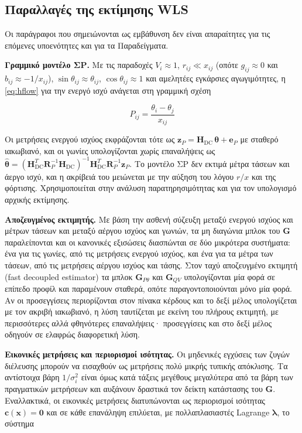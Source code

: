 \subsection{Παραλλαγές της εκτίμησης WLS}

Οι παράγραφοι που σημειώνονται ως εμβάθυνση δεν είναι απαραίτητες για τις επόμενες
υποενότητες και για τα Παραδείγματα.

\textbf{Γραμμικό μοντέλο ΣΡ.} Με τις παραδοχές $V_i \approx 1$, $r_{ij} \ll x_{ij}$ (οπότε
$g_{ij} \approx 0$ και $b_{ij} \approx -1/x_{ij}$), $\sin\theta_{ij} \approx \theta_{ij}$,
$\cos\theta_{ij} \approx 1$ και αμελητέες εγκάρσιες αγωγιμότητες, η \eqref{eq:hflow} για την
ενεργό ισχύ ανάγεται στη γραμμική σχέση

\begin{equation}
P_{ij} = \frac{\theta_i - \theta_j}{x_{ij}}
\label{eq:dcflow}
\end{equation}

Οι μετρήσεις ενεργού ισχύος εκφράζονται τότε ως $\mathbf{z}_P = \mathbf{H}_{\mathrm{DC}}\,
\boldsymbol{\theta} + \mathbf{e}_P$ με σταθερό ιακωβιανό, και οι γωνίες υπολογίζονται χωρίς
επαναλήψεις ως $\hat{\boldsymbol{\theta}} = (\mathbf{H}_{\mathrm{DC}}^{T}\mathbf{R}_P^{-1}
\mathbf{H}_{\mathrm{DC}})^{-1}\mathbf{H}_{\mathrm{DC}}^{T}\mathbf{R}_P^{-1}\mathbf{z}_P$. Το
μοντέλο ΣΡ δεν εκτιμά μέτρα τάσεων και άεργο ισχύ, και η ακρίβειά του μειώνεται με την αύξηση
του λόγου $r/x$ και της φόρτισης. Χρησιμοποιείται στην ανάλυση παρατηρησιμότητας και για
τον υπολογισμό αρχικής εκτίμησης.

\textbf{Αποζευγμένος εκτιμητής.} Με βάση την ασθενή σύζευξη μεταξύ ενεργού ισχύος και μέτρων
τάσεων και μεταξύ αέργου ισχύος και γωνιών, τα μη διαγώνια μπλοκ του $\mathbf{G}$ παραλείπονται
και οι κανονικές εξισώσεις διασπώνται σε δύο μικρότερα συστήματα: ένα για τις γωνίες, από
τις μετρήσεις ενεργού ισχύος, και ένα για τα μέτρα των τάσεων, από τις μετρήσεις αέργου
ισχύος και τάσης. Στον ταχύ αποζευγμένο εκτιμητή (fast decoupled estimator) τα μπλοκ
$\mathbf{G}_{P\theta}$ και $\mathbf{G}_{QV}$ υπολογίζονται μία φορά σε επίπεδο προφίλ και
παραμένουν σταθερά, οπότε παραγοντοποιούνται μόνο μία φορά. Αν οι προσεγγίσεις περιορίζονται
στον πίνακα κέρδους και το δεξί μέλος υπολογίζεται με τον ακριβή ιακωβιανό, η λύση ταυτίζεται
με εκείνη του πλήρους εκτιμητή, με περισσότερες αλλά φθηνότερες επαναλήψεις· προσεγγίσεις και
στο δεξί μέλος οδηγούν σε ελαφρώς διαφορετική λύση.

\textbf{Εικονικές μετρήσεις και περιορισμοί ισότητας.} Οι μηδενικές εγχύσεις των ζυγών
διέλευσης μπορούν να εισαχθούν ως μετρήσεις πολύ μικρής τυπικής απόκλισης. Τα αντίστοιχα βάρη
$1/\sigma_i^2$ είναι όμως κατά τάξεις μεγέθους μεγαλύτερα από τα βάρη των πραγματικών
μετρήσεων και αυξάνουν δραστικά τον δείκτη κατάστασης του $\mathbf{G}$. Εναλλακτικά, οι
εικονικές μετρήσεις διατυπώνονται ως περιορισμοί ισότητας $\mathbf{c}(\mathbf{x}) = \mathbf{0}$
και σε κάθε επανάληψη επιλύεται, με πολλαπλασιαστές Lagrange $\boldsymbol{\lambda}$, το σύστημα

